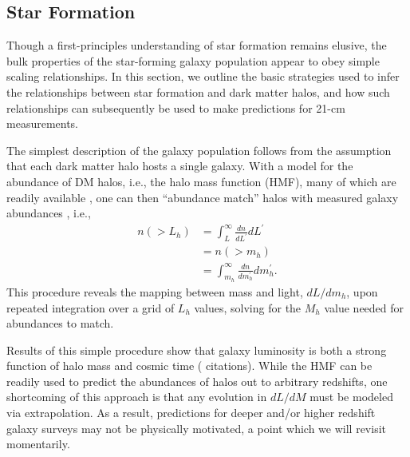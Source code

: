 \subsection{Star Formation} \label{sec:sfe}
Though a first-principles understanding of star formation remains elusive, the bulk properties of the star-forming galaxy population appear to obey simple scaling relationships. In this section, we outline the basic strategies used to infer the relationships between star formation and dark matter halos, and how such relationships can subsequently be used to make predictions for 21-cm measurements. 

The simplest description of the galaxy population follows from the assumption that each dark matter halo hosts a single galaxy. With a model for the abundance of DM halos, i.e., the halo mass function (HMF), many of which are readily available \cite{PS1974,SMT2001}, one can then ``abundance match'' halos with measured galaxy abundances \cite{Bouwens2015,Finkelstein2015}, i.e.,
\begin{align}
	n(>L_h) & = \int_L^{\infty} \frac{dn}{dL^{\prime}} dL^{\prime} \nonumber \\
	& = n(>m_h)  \nonumber \\
	& = \int_{m_h}^{\infty} \frac{dn}{dm_h^{\prime}} dm_h^{\prime} .
\end{align}
This procedure reveals the mapping between mass and light, $dL/dm_h$, upon repeated integration over a grid of $L_h$ values, solving for the $M_h$ value needed for abundances to match. 

Results of this simple procedure show that galaxy luminosity is both a strong function of halo mass and cosmic time ({\color{red} citations}). While the HMF can be readily used to predict the abundances of halos out to arbitrary redshifts, one shortcoming of this approach is that any evolution in $dL/dM$ must be modeled via extrapolation. As a result, predictions for deeper and/or higher redshift galaxy surveys may not be physically motivated, a point which we will revisit momentarily.

